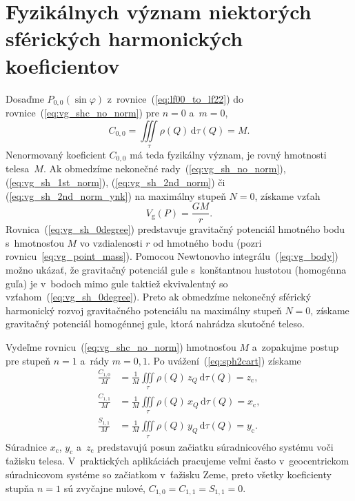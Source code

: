 \documentclass[a4paper,12pt]{book}
\newcommand{\diff}{\mathrm d}
\newcommand{\gidx}{\mathrm g}
\begin{document}

\section{Fyzikálnych význam niektorých sférických harmonických koeficientov}
\label{sec:physical_meaning_of_spherical_harmonic_coefficients}

Dosaďme $P_{0,0}(\sin\varphi)$ z~rovnice~(\ref{eq:lf00_to_lf22})
do rovnice~(\ref{eq:vg_shc_no_norm}) pre $n = 0$ a~$m = 0$,
%
\begin{equation}
\label{eq:c00_mass}
C_{0,0} = \iiint\limits_{\tau} \rho(Q) \, \diff \tau(Q) = M{.}
\end{equation}
%
Nenormovaný koeficient $C_{0,0}$ má teda fyzikálny význam, je rovný hmotnosti 
telesa~$M$.  Ak obmedzíme nekonečné rady~(\ref{eq:vg_sh_no_norm}), 
(\ref{eq:vg_sh_1st_norm}), (\ref{eq:vg_sh_2nd_norm}) či 
(\ref{eq:vg_sh_2nd_norm_ynk}) na maximálny stupeň $N = 0$, získame vzťah
%
\begin{equation}
\label{eq:vg_sh_0degree}
V_\gidx(P) = \frac{GM}{r}{.}
\end{equation}
%
Rovnica~(\ref{eq:vg_sh_0degree}) predstavuje gravitačný potenciál hmotného bodu 
s~hmotnosťou $M$ vo vzdialenosti $r$ od hmotného bodu (pozri 
rovnicu~\ref{eq:vg_point_mass}).  Pomocou Newtonovho 
integrálu~(\ref{eq:vg_body}) možno ukázať, že gravitačný potenciál gule 
s~konštantnou hustotou (homogénna guľa) je v~bodoch mimo gule taktiež 
ekvivalentný so vzťahom~(\ref{eq:vg_sh_0degree}).  Preto ak obmedzíme nekonečný 
sférický harmonický rozvoj gravitačného potenciálu na maximálny stupeň $N = 0$, 
získame gravitačný potenciál homogénnej gule, ktorá nahrádza skutočné teleso.

Vydeľme rovnicu~(\ref{eq:vg_shc_no_norm}) hmotnosťou $M$ a~zopakujme postup pre
stupeň $n = 1$ a~rády $m = 0, 1$.  Po uvážení~(\ref{eq:sph2cart}) získame
%
\begin{equation}
\begin{split}
\frac{C_{1,0}}{M} &= \frac{1}{M} \iiint\limits_{\tau} \rho(Q) \, z_Q \, \diff 
\tau(Q) = z_\mathrm{c}{,}\\
\frac{C_{1,1}}{M} &= \frac{1}{M} \iiint\limits_{\tau} \rho(Q) \, x_Q \, \diff 
\tau(Q) = x_\mathrm{c}{,}\\
\frac{S_{1,1}}{M} &= \frac{1}{M} \iiint\limits_{\tau} \rho(Q) \, y_Q \, \diff 
\tau(Q) = y_\mathrm{c}{.}
\end{split}
\end{equation}
%
Súradnice $x_\mathrm{c}$, $y_\mathrm{c}$ a~$z_\mathrm{c}$ predstavujú posun
začiatku súradnicového systému voči ťažisku telesa.  V~praktických aplikáciách 
pracujeme veľmi často v~geocentrickom súradnicovom systéme so
začiatkom v~ťažisku Zeme, preto všetky koeficienty stupňa $n = 1$ sú zvyčajne
nulové, $C_{1,0} = C_{1,1} = S_{1,1} = 0$.
\end{document}
